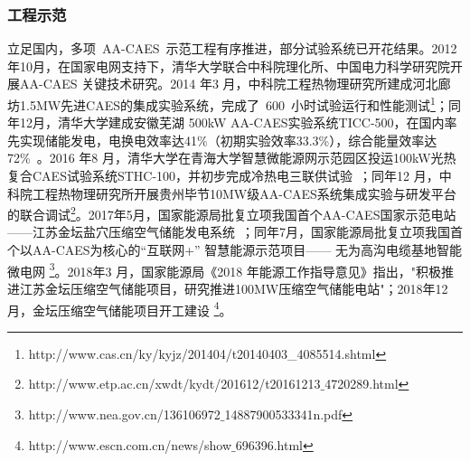 \subsubsection{工程示范}
立足国内，多项~AA-CAES~示范工程有序推进，部分试验系统已开花结果。2012年10月，在国家电网支持下，清华大学联合中科院理化所、中国电力科学研究院开展AA-CAES 关键技术研究\cite{CAES-Review-17-Rui-salt}。2014 年3 月，中科院工程热物理研究所建成河北廊坊1.5MW先进CAES的集成实验系统，完成了~600~小时试验运行和性能测试\footnote{http://www.cas.cn/ky/kyjz/201404/t20140403\_4085514.shtml}；同年12月，清华大学建成安徽芜湖 500kW AA-CAES实验系统TICC-500，在国内率先实现储能发电，电换电效率达41\%（初期实验效率33.3\%），综合能量效率达72\%~\cite{TICC-15,TICC-16}。2016 年8 月，清华大学在青海大学智慧微能源网示范园区投运100kW光热复合CAES试验系统STHC-100，并初步完成冷热电三联供试验~\cite{ST-CAES-17,ST-CAES-CN-16-Rui}；同年12 月，中科院工程热物理研究所开展贵州毕节10MW级AA-CAES系统集成实验与研发平台的联合调试\footnote{http://www.etp.ac.cn/xwdt/kydt/201612/t20161213$\_$4720289.html}。2017年5月，国家能源局批复立项我国首个AA-CAES国家示范电站——江苏金坛盐穴压缩空气储能发电系统~\cite{CAES-Review-17-Rui-salt}；同年7月，国家能源局批复立项我国首个以AA-CAES为核心的“互联网+” 智慧能源示范项目—— 无为高沟电缆基地智能微电网
\footnote{http://www.nea.gov.cn/136106972$\_$14887900533341n.pdf}。2018年3 月，国家能源局《2018 年能源工作指导意见》指出，"积极推进江苏金坛压缩空气储能项目，研究推进100MW压缩空气储能电站"；2018年12月，金坛压缩空气储能项目开工建设
\footnote{http://www.escn.com.cn/news/show$\_$696396.html}。

